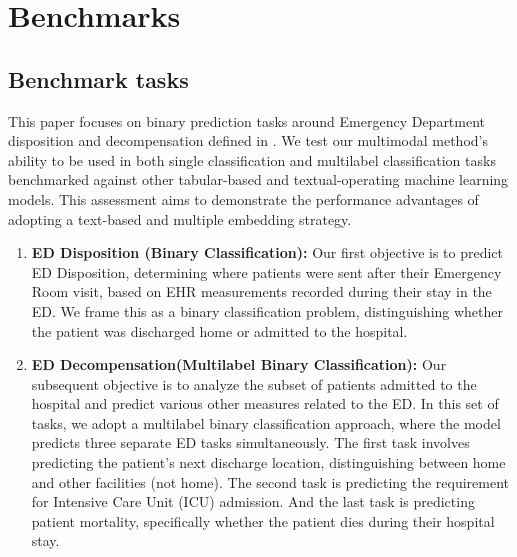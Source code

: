 \documentclass[pmlr]{jmlr}%
\begin{document}

\section{Benchmarks}
\label{data}
\subsection{Benchmark tasks}

This paper focuses on binary prediction tasks around Emergency Department disposition and decompensation defined in \citep{chen2023multimodal}. We test our multimodal method's ability to be used in both single classification and multilabel classification tasks benchmarked against other tabular-based and textual-operating machine learning models. This assessment aims to demonstrate the performance advantages of adopting a text-based and multiple embedding strategy.

\begin{enumerate}
        \item \textbf{ED Disposition (Binary Classification):} Our first objective is to predict ED Disposition, determining where patients were sent after their Emergency Room visit, based on EHR measurements recorded during their stay in the ED. We frame this as a binary classification problem, distinguishing whether the patient was discharged home or admitted to the hospital.
        
        \item \textbf{ED Decompensation(Multilabel Binary Classification):} Our subsequent objective is to analyze the subset of patients admitted to the hospital and predict various other measures related to the ED. In this set of tasks, we adopt a multilabel binary classification approach, where the model predicts three separate ED tasks simultaneously. The first task involves predicting the patient's next discharge location, distinguishing between home and other facilities (not home). The second task is predicting the requirement for Intensive Care Unit (ICU) admission.
        And the last task
        is predicting patient mortality, specifically whether the patient dies during their 
        hospital stay.  
\end{enumerate}
\end{document}
